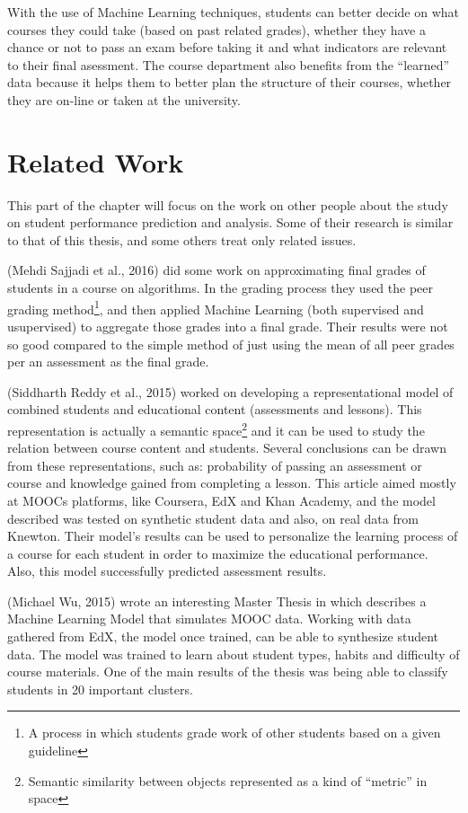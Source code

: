 With the use of Machine Learning techniques, students can better decide on what courses 
they could take (based on past related grades), whether they have a chance or not to 
pass an exam before taking it and what indicators are relevant to their final asessment. 
The course department also benefits from the ``learned'' data because it helps them 
to better plan the structure of their courses, whether they are on-line or taken at 
the university.

\section{Related Work}

This part of the chapter will focus on the work on other people about the study 
on student performance prediction and analysis. Some of their research is similar 
to that of this thesis, and some others treat only related issues. 

(Mehdi Sajjadi et al., 2016)\cite{bibl_1} did some work on approximating final grades 
of students in a course on algorithms. In the grading process they used the peer 
grading method\footnote{A process in which students grade work of other students 
based on a given guideline}, and then applied Machine Learning (both supervised and 
usupervised) to aggregate those grades into a final grade. Their results were 
not so good compared to the simple method of just using the mean of all peer grades 
per an assessment as the final grade. 

(Siddharth Reddy et al., 2015)\cite{bibl_2} worked on developing a representational 
model of combined students and educational content (assessments and lessons). 
This representation is actually a semantic space\footnote{Semantic similarity 
between objects represented as a kind of ``metric'' in space} and it can be used 
to study the relation between course content and students. Several conclusions can 
be drawn from these representations, such as: probability of passing an assessment 
or course and knowledge gained from completing a lesson. This article aimed mostly 
at MOOCs platforms, like Coursera, EdX and Khan Academy, and the model described 
was tested on synthetic student data and also, on real data from Knewton.
Their model's results can be used to personalize the learning process of a course 
for each student in order to maximize the educational performance. Also, this 
model successfully predicted assessment results.

(Michael Wu, 2015)\cite{bibl_2_1} wrote an interesting Master Thesis in which 
describes a Machine Learning Model that simulates MOOC data. Working with data 
gathered from EdX, the model once trained, can be able to synthesize student data.
The model was trained to learn about student types, habits and difficulty of course 
materials. One of the main results of the thesis was being able to classify 
students in 20 important clusters.

